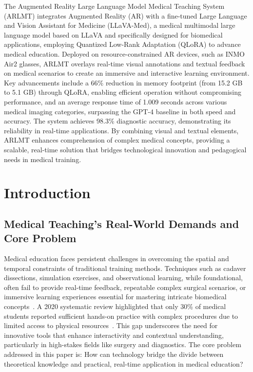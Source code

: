 \documentclass[10pt,letterpaper]{article}
\begin{document}
The Augmented Reality Large Language Model Medical Teaching System (ARLMT) integrates Augmented Reality (AR) with a fine-tuned Large Language and Vision Assistant for Medicine (LLaVA-Med), a medical multimodal large language model based on LLaVA and specifically designed for biomedical applications, employing Quantized Low-Rank Adaptation (QLoRA) to advance medical education. Deployed on resource-constrained AR devices, such as INMO Air2 glasses, ARLMT overlays real-time visual annotations and textual feedback on medical scenarios to create an immersive and interactive learning environment. Key advancements include a 66\% reduction in memory footprint (from 15.2 GB to 5.1 GB) through QLoRA, enabling efficient operation without compromising performance, and an average response time of 1.009 seconds across various medical imaging categories, surpassing the GPT-4 baseline in both speed and accuracy. The system achieves 98.3\% diagnostic accuracy, demonstrating its reliability in real-time applications. By combining visual and textual elements, ARLMT enhances comprehension of complex medical concepts, providing a scalable, real-time solution that bridges technological innovation and pedagogical needs in medical training.



\linenumbers

\section*{Introduction}

\subsection*{Medical Teaching’s Real-World Demands and Core Problem}

Medical education faces persistent challenges in overcoming the spatial and temporal constraints of traditional training methods. Techniques such as cadaver dissections, simulation exercises, and observational learning, while foundational, often fail to provide real-time feedback, repeatable complex surgical scenarios, or immersive learning experiences essential for mastering intricate biomedical concepts~\cite{tang2020augmented,tang2020}. A 2020 systematic review highlighted that only 30\% of medical students reported sufficient hands-on practice with complex procedures due to limited access to physical resources~\cite{tang2020augmented}. This gap underscores the need for innovative tools that enhance interactivity and contextual understanding, particularly in high-stakes fields like surgery and diagnostics. The core problem addressed in this paper is: How can technology bridge the divide between theoretical knowledge and practical, real-time application in medical education?
\end{document}
